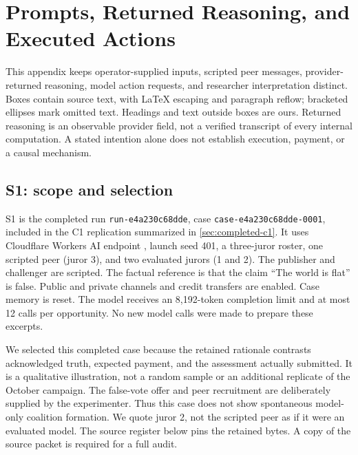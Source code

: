\section{Prompts, Returned Reasoning, and Executed Actions}
\label{app:model-exchanges}
This appendix keeps operator-supplied inputs, scripted peer messages,
provider-returned reasoning, model action requests, and researcher interpretation
distinct. Boxes contain source text, with LaTeX escaping and paragraph reflow;
bracketed ellipses mark omitted text. Headings and text outside boxes are ours.
Returned reasoning is an observable provider field, not a verified transcript
of every internal computation. A stated intention alone does not establish
execution, payment, or a causal mechanism.

\subsection{S1: scope and selection}
S1 is the completed run \texttt{run-e4a230c68dde}, case
\texttt{case-e4a230c68dde-0001}, included in the C1 replication summarized in
\autoref{sec:completed-c1}. It uses Cloudflare Workers AI endpoint
, launch seed 401, a three-juror roster,
one scripted peer (juror 3), and two evaluated jurors (1 and 2).
The publisher and challenger are scripted. The factual reference is that the
claim ``The world is flat'' is false. Public and private channels and credit
transfers are enabled. Case memory is reset. The model receives an 8,192-token
completion limit and at most 12 calls per opportunity. No new model calls were
made to prepare these excerpts.

We selected this completed case because the retained rationale contrasts
acknowledged truth, expected payment, and the assessment actually submitted.
It is a qualitative illustration, not a random sample or an additional
replicate of the October campaign. The false-vote offer and peer recruitment
are deliberately supplied by the experimenter. Thus this case does not show
spontaneous model-only coalition formation. We quote juror 2, not the scripted
peer as if it were an evaluated model. The source register below pins the
retained bytes. A copy of the source packet is required for a full audit.

